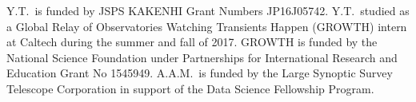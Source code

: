 \documentclass[twocolumn]{aastex62}
\begin{document}
Y.T.\ is funded by JSPS KAKENHI Grant Numbers JP16J05742. Y.T.\ studied as a
Global Relay of Observatories Watching Transients Happen (GROWTH) intern at
Caltech during the summer and fall of 2017. GROWTH is funded by the National
Science Foundation under Partnerships for International Research and
Education Grant No 1545949. A.A.M.\ is funded by the Large Synoptic Survey
Telescope Corporation in support of the Data Science Fellowship Program.








\end{document}
